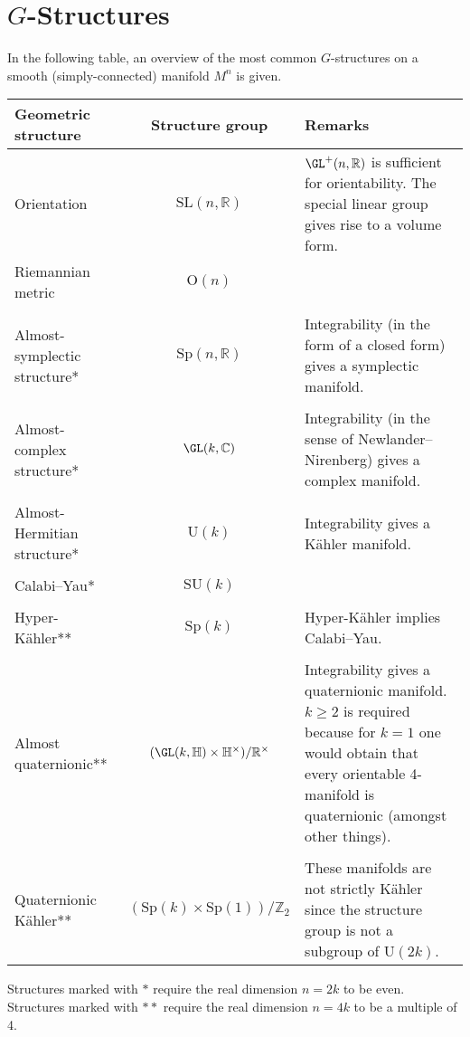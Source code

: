 \chapter{\texorpdfstring{$G$-Structures}{G-Structures}}
\setcounter{section}{1}

    In the following table, an overview of the most common $G$-structures on a smooth (simply-connected) manifold $M^n$ is given.
    \begin{center}
        \begin{tabularx}{\textwidth}{|l|c|X|}
             \hline
                 Geometric structure&Structure group&Remarks\\
             \hline
                 Orientation&$\mathrm{SL}(n,\mathbb{R})$&$\GL^+(n,\mathbb{R})$ is sufficient for orientability. The special linear group gives rise to a volume form.\\
                 Riemannian metric&$\mathrm{O}(n)$&\\&&\\
                 Almost-symplectic structure*&$\mathrm{Sp}(n,\mathbb{R})$&Integrability (in the form of a closed form) gives a symplectic manifold.\\&&\\
                 Almost-complex structure*&$\GL(k,\mathbb{C})$&Integrability (in the sense of Newlander--Nirenberg) gives a complex manifold.\\&&\\
                 Almost-Hermitian structure*&$\mathrm{U}(k)$&Integrability gives a K\"ahler manifold.\\&&\\
                 Calabi--Yau*&$\mathrm{SU}(k)$&\\&&\\
                 Hyper-K\"ahler**&$\mathrm{Sp}(k)$&Hyper-K\"ahler implies Calabi--Yau.\\&&\\
                 Almost quaternionic**&$(\GL(k,\mathbb{H})\times\mathbb{H}^\times)/\mathbb{R}^\times$&Integrability gives a quaternionic manifold. $k\geq2$ is required because for $k=1$ one would obtain that every orientable 4-manifold is quaternionic (amongst other things).\\&&\\
                 Quaternionic K\"ahler**&$(\mathrm{Sp}(k)\times\mathrm{Sp}(1))/\mathbb{Z}_2$&These manifolds are not strictly K\"ahler since the structure group is not a subgroup of $\mathrm{U}(2k)$.\\
             \hline
        \end{tabularx}
    \end{center}
    Structures marked with $\ast$ require the real dimension $n=2k$ to be even. Structures marked with $\ast\ast$ require the real dimension $n=4k$ to be a multiple of 4.

